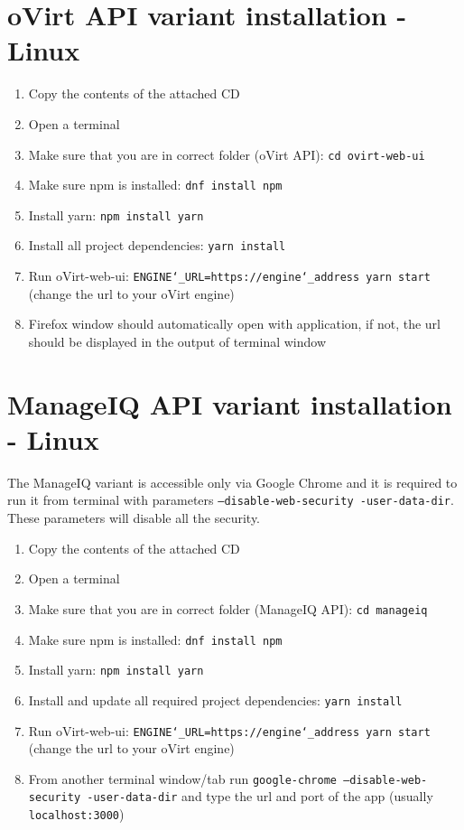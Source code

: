 \section{oVirt API variant installation - Linux}
\begin{enumerate}

\item Copy the contents of the attached CD 
\item Open a terminal
\item Make sure that you are in correct folder (oVirt API): \texttt{cd ovirt-web-ui}
\item Make sure npm is installed: \texttt{dnf install npm}
\item Install yarn: \texttt{npm install yarn}
\item Install all project dependencies: \texttt{yarn install}
\item Run oVirt-web-ui: \texttt{ENGINE\char`_URL=https://engine\char`_address yarn start} (change the url to your oVirt engine)
\item Firefox window should automatically open with application, if not, the url should be displayed in the output of terminal window
\end{enumerate} 

\newpage
\section{ManageIQ API variant installation - Linux}
The ManageIQ variant is accessible only via Google Chrome and it is required to run it from terminal with parameters \texttt{--disable-web-security -user-data-dir}. These parameters will disable all the security.
\begin{enumerate}

\item Copy the contents of the attached CD 
\item Open a terminal
\item Make sure that you are in correct folder (ManageIQ API): \texttt{cd manageiq}
\item Make sure npm is installed: \texttt{dnf install npm}
\item Install yarn: \texttt{npm install yarn}
\item Install and update all required project dependencies: \texttt{yarn install}
\item Run oVirt-web-ui: \texttt{ENGINE\char`_URL=https://engine\char`_address yarn start} (change the url to your oVirt engine)
\item From another terminal window/tab run \texttt{google-chrome --disable-web-security -user-data-dir} and type the url and port of the app (usually \texttt{localhost:3000})
\end{enumerate} 

